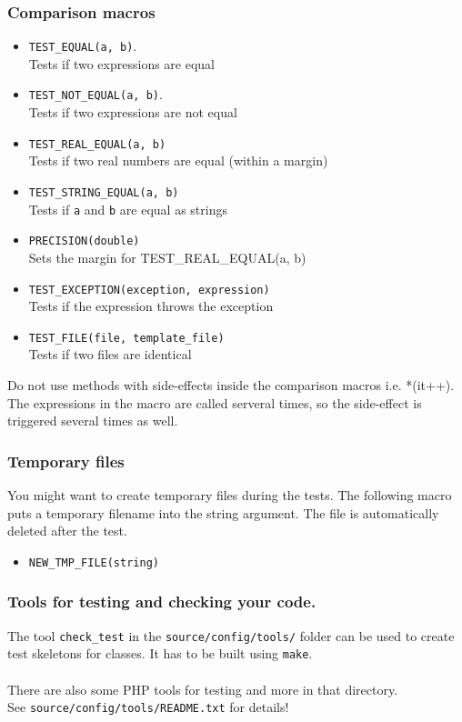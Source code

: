 \documentclass[a4]{article}
\begin{document}
\subsubsection{Comparison macros}
\begin{itemize}
        \item {\tt TEST\_EQUAL(a, b)}.\\ Tests if two expressions are equal
        \item {\tt TEST\_NOT\_EQUAL(a, b)}.\\ Tests if two expressions are not equal
        \item {\tt TEST\_REAL\_EQUAL(a, b)} \\ Tests if two real numbers are equal (within a margin)
        \item {\tt TEST\_STRING\_EQUAL(a, b)} \\ Tests if \texttt a and \texttt b are equal as strings
        \item {\tt PRECISION(double)} \\ Sets the margin for TEST\_REAL\_EQUAL(a, b)
        \item {\tt TEST\_EXCEPTION(exception, expression)} \\ Tests if the expression throws the exception
        \item {\tt TEST\_FILE(file, template\_file)} \\ Tests if two files are identical
\end{itemize}
Do not use methods with side-effects inside the comparison macros i.e. *(it++). The expressions
in the macro are called serveral times, so the side-effect is triggered several times as well.

\subsubsection{Temporary files}
You might want to create temporary files during the tests. The following macro
puts a temporary filename into the string argument. The file is automatically deleted
after the test.
\begin{itemize}
        \item {\tt NEW\_TMP\_FILE(string)}
\end{itemize}

\subsubsection{Tools for testing and checking your code.}
The tool {\tt check\_test} in the {\tt source/config/tools/} folder can be used to
create test skeletons for classes. It has to be built using {\tt make}.\\
\\
There are also some PHP tools for testing and more in that directory.\\
See {\tt source/config/tools/README.txt} for details!
\end{document}
